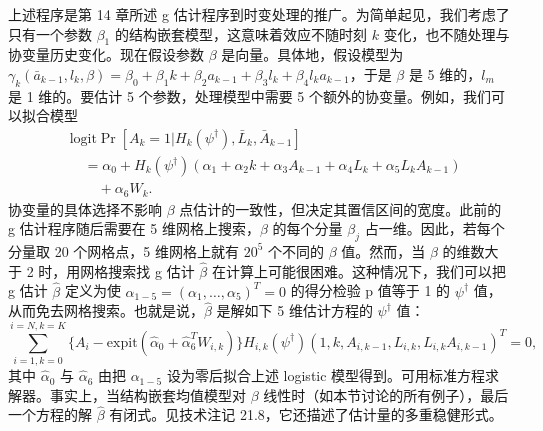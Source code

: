 上述程序是第 14 章所述 g 估计程序到时变处理的推广。为简单起见，我们考虑了只有一个参数 $\beta_1$ 的结构嵌套模型，这意味着效应不随时刻 $k$ 变化，也不随处理与协变量历史变化。现在假设参数 $\beta$ 是向量。具体地，假设模型为 $\gamma_k(\bar a_{k-1},l_k,\beta)=\beta_0+\beta_1k+\beta_2a_{k-1}+\beta_3l_k+\beta_4l_ka_{k-1}$，于是 $\beta$ 是 5 维的，$l_m$ 是 1 维的。要估计 5 个参数，处理模型中需要 5 个额外的协变量。例如，我们可以拟合模型
\[
\begin{aligned}
&\mathrm{logit}\Pr[A_k=1|H_k(\psi^\dagger),\bar L_k,\bar A_{k-1}]\\
&\quad=\alpha_0+H_k(\psi^\dagger)(\alpha_1+\alpha_2k+\alpha_3A_{k-1}+\alpha_4L_k+\alpha_5L_kA_{k-1})\\
&\qquad+\alpha_6W_k.
\end{aligned}
\]
协变量的具体选择不影响 $\beta$ 点估计的一致性，但决定其置信区间的宽度。此前的 g 估计程序随后需要在 5 维网格上搜索，$\beta$ 的每个分量 $\beta_j$ 占一维。因此，若每个分量取 20 个网格点，5 维网格上就有 $20^5$ 个不同的 $\beta$ 值。然而，当 $\beta$ 的维数大于 2 时，用网格搜索找 g 估计 $\hat\beta$ 在计算上可能很困难。这种情况下，我们可以把 g 估计 $\hat\beta$ 定义为使 $\alpha_{1-5}=(\alpha_1,\dots,\alpha_5)^T=0$ 的得分检验 p 值等于 1 的 $\psi^\dagger$ 值，从而免去网格搜索。也就是说，$\hat\beta$ 是解如下 5 维估计方程的 $\psi^\dagger$ 值：
\[
\sum_{i=1,k=0}^{i=N,k=K}\{A_i-\mathrm{expit}(\hat\alpha_0+\hat\alpha_6^TW_{i,k})\}H_{i,k}(\psi^\dagger)(1,k,A_{i,k-1},L_{i,k},L_{i,k}A_{i,k-1})^T=0,
\]
其中 $\hat\alpha_0$ 与 $\hat\alpha_6$ 由把 $\alpha_{1-5}$ 设为零后拟合上述 logistic 模型得到。可用标准方程求解器。事实上，当结构嵌套均值模型对 $\beta$ 线性时（如本节讨论的所有例子），最后一个方程的解 $\hat\beta$ 有闭式。见技术注记 21.8，它还描述了估计量的多重稳健形式。


